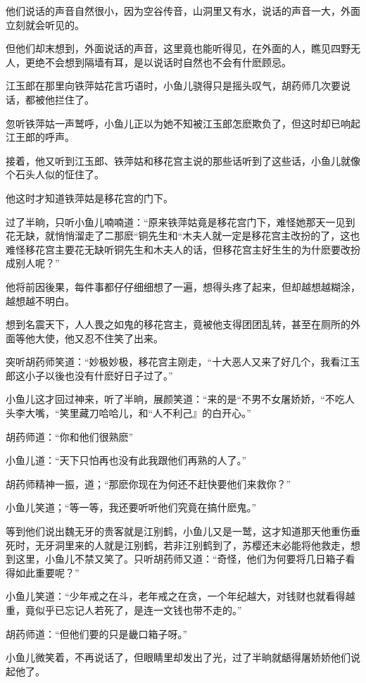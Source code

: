 \documentclass[12pt,oneside]{book}
\begin{document}
他们说话的声音自然很小，因为空谷传音，山洞里又有水，说话的声音一大，外面立刻就会听见的。

但他们却末想到，外面说话的声音，这里竟也能听得见，在外面的人，瞧见四野无人，更绝不会想到隔墙有耳，是以说话时自然也不会有什麽顾忌。

江玉郎在那里向铁萍姑花言巧语时，小鱼儿骁得只是摇头叹气，胡药师几次要说话，都被他拦住了。

忽听铁萍姑一声鹫呼，小鱼儿正以为她不知被江玉郎怎麽欺负了，但这时却已响起江王郎的呼声。

接着，他又听到江玉郎、铁萍姑和移花宫主说的那些话听到了这些话，小鱼儿就像个石头人似的怔住了。

他这时才知道铁萍姑是移花宫的门下。

过了半晌，只听小鱼儿喃喃道：``原来铁萍姑竟是移花宫门下，难怪她那天一见到花无缺，就悄悄溜走了二那麽``铜先生和``木夫人就一定是移花宫主改扮的了，这也难怪移花宫主要花无缺听铜先生和木夫人的话，但移花宫主好生生的为什麽要改扮成别人呢？''

他将前因後果，每件事都仔仔细细想了一遍，想得头疼了起来，但却越想越糊涂，越想越不明白。

想到名震天下，人人畏之如鬼的移花宫主，竟被他支得团团乱转，甚至在厕所的外面等他大使，他又忍不住笑了出来。

突听胡药师笑道：``妙极妙极，移花宫主刚走，``十大恶人又来了好几个，我看江玉郎这小子以後也没有什麽好日子过了。''

小鱼儿这才回过神来，听了半晌，展颜笑道：``来的是``不男不女屠娇娇，``不吃人头李大嘴，``笑里藏刀哈哈儿，和``人不利己』的白开心。''

胡药师道：``你和他们很熟麽''

小鱼儿道：``天下只怕再也没有此我跟他们再熟的人了。''

胡药师精神一振，道；``那麽你现在为何还不赶快要他们来救你？''

小鱼儿笑道；``等一等，我还要听听他们究竟在搞什麽鬼。''

等到他们说出魏无牙的贵客就是江别鹤，小鱼儿又是一鹫，这才知道那天他重伤垂死时，无牙洞里来的人就是江别鹤，若非江别鹤到了，苏樱还末必能将他救走，想到这里，小鱼儿不禁又笑了。只听胡药师又道：``奇怪，他们为何要将几日箱子看得如此重要呢？''

小鱼儿笑道：``少年戒之在斗，老年戒之在贪，一个年纪越大，对钱财也就看得越重，竟似乎已忘记人若死了，是连一文钱也带不走的。''

胡药师道：``但他们要的只是畿口箱子呀。''

小鱼儿微笑着，不再说话了，但眼睛里却发出了光，过了半晌就龉得屠娇娇他们说起他了。
\end{document}
